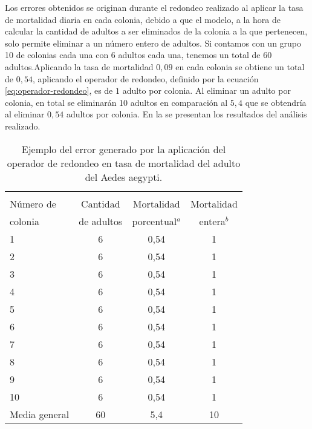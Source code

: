 Los errores obtenidos se originan durante el redondeo realizado al aplicar la tasa de mortalidad
diaria en cada colonia, debido a que el modelo, a la hora de calcular la cantidad de adultos a ser
eliminados de la colonia a la que pertenecen, solo permite eliminar a un número entero de adultos.
Si contamos con un grupo 10 de colonias cada una con 6 adultos cada una, tenemos un total de 60
adultos.Aplicando la tasa de mortalidad $0,09$ en cada colonia se obtiene un total de $0,54$,
aplicando el operador de redondeo, definido por la ecuación \eqref{eq:operador-redondeo}, es de $1$
adulto por colonia. Al eliminar un adulto por colonia, en total se eliminarán 10 adultos en
comparación al $5,4$ que se obtendría al eliminar $0,54$ adultos por colonia. En la
 se presentan los resultados del análisis realizado.

\begin{table}[!htbp]
    \begin{minipage}{\textwidth}
        \centering
        \caption{ \label{tab:mortalidad-adulto-error}Ejemplo del error generado por la aplicación
        del operador de redondeo en tasa de mortalidad del adulto del Aedes aegypti.}
        \begin{tabular}{l c c c }
            \hline \\
            Número de & Cantidad  & Mortalidad      & Mortalidad \\
            colonia   &de adultos & porcentual$^{a}$ & entera$^{b}$\\
            \hline
            \hline
            1       & 6  & 0,54 & 1\\
            2       & 6  & 0,54 & 1\\
            3       & 6  & 0,54 & 1\\
            4       & 6  & 0,54 & 1\\
            5       & 6  & 0,54 & 1\\
            6       & 6  & 0,54 & 1\\
            7       & 6  & 0,54 & 1\\
            8       & 6  & 0,54 & 1\\
            9       & 6  & 0,54 & 1\\
            10      & 6  & 0,54 & 1\\
            Media general   & 60 & 5,4  & 10\\
        \end{tabular}
    \end{minipage}
\end{table}
